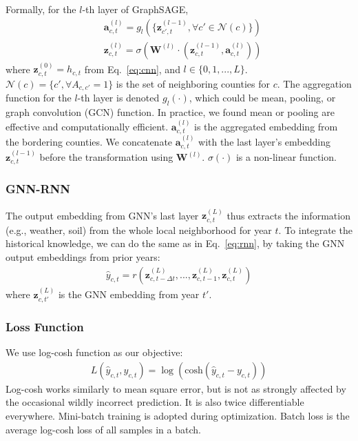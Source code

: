 Formally, for the $l$-th layer of GraphSAGE, 
\begin{equation}
\label{eq:gnn}
\begin{aligned}
&\mathbf{a}_{c,t}^{(l)} = g_l(\{\mathbf{z}_{c',t}^{(l-1)},\forall c'\in\mathcal N(c)\})\\
&\mathbf{z}_{c,t}^{(l)} = \sigma(\mathbf{W}^{(l)}\cdot (\mathbf{z}_{c,t}^{(l-1)}, \mathbf{a}_{c,t}^{(l)}))
\end{aligned}
\end{equation}
where $\mathbf{z}_{c,t}^{(0)}=h_{c,t}$ from Eq.~\ref{eq:cnn}, and $l\in\{0,1,...,L\}$. $\mathcal N(c)=\{c', \forall A_{c,c'}=1\}$ is the set of neighboring counties for $c$. The aggregation function for the $l$-th layer is denoted $g_l(\cdot)$, which could be mean, pooling, or graph convolution (GCN) function. In practice, we found mean or pooling are effective and computationally efficient. $\mathbf{a}_{c,t}^{(l)}$ is the aggregated embedding from the bordering counties. We concatenate $\mathbf{a}_{c,t}^{(l)}$ with the last layer's embedding $\mathbf{z}_{c,t}^{(l-1)}$ before the transformation using $\mathbf{W}^{(l)}$. $\sigma(\cdot)$ is a non-linear function.

\subsubsection{GNN-RNN}
The output embedding from GNN's last layer $\mathbf{z}_{c,t}^{(L)}$ thus extracts the information (e.g., weather, soil) from the whole local neighborhood for year $t$. To integrate the historical knowledge, we can do the same as in Eq.~\ref{eq:rnn}, by taking the GNN output embeddings from prior years:
\begin{equation}
\label{eq:gnn-rnn}
\begin{aligned}
\widehat{y}_{c,t}=r(\mathbf{z}_{c,t-\Delta t}^{(L)}, ..., \mathbf{z}_{c,t-1}^{(L)}, \mathbf{z}_{c,t}^{(L)})
\end{aligned}
\end{equation}
where $\mathbf{z}_{c,t'}^{(L)}$ is the GNN embedding from year $t'$.

\subsubsection{Loss Function}
We use log-cosh function as our objective:
\begin{equation}
\begin{aligned}
L(\widehat{y}_{c,t}, y_{c,t})=\log(\text{cosh}(\widehat{y}_{c,t}-y_{c,t}))
\end{aligned}
\end{equation}
Log-cosh works similarly to mean square error, but is not as strongly affected by the occasional wildly incorrect prediction. It is also twice differentiable everywhere. Mini-batch training is adopted during optimization. Batch loss is the average log-cosh loss of all samples in a batch. 
